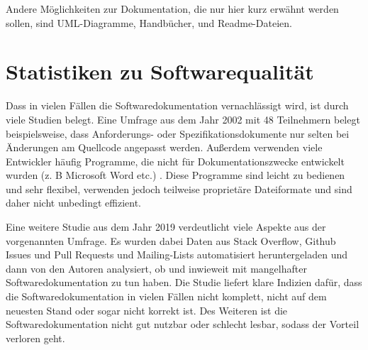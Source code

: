 Andere Möglichkeiten zur Dokumentation, die nur hier kurz erwähnt werden sollen, sind UML-Diagramme, Handbücher, und  Readme-Dateien.


\section{Statistiken zu Softwarequalität}
Dass in vielen Fällen die Softwaredokumentation vernachlässigt wird, ist durch viele Studien belegt. Eine Umfrage aus dem Jahr 2002 mit 48 Teilnehmern belegt beispielsweise, dass Anforderungs- oder Spezifikationsdokumente nur selten bei Änderungen am Quellcode angepasst werden. Außerdem verwenden viele Entwickler häufig Programme, die nicht für Dokumentationszwecke entwickelt wurden (z. B Microsoft Word etc.) \cite[S. 28-29]{TheRelevanceofSoftwareDocumentationToolsandTechnologies:ASurvey}. Diese Programme sind leicht zu bedienen und sehr flexibel, verwenden jedoch teilweise proprietäre Dateiformate und sind daher nicht unbedingt effizient.

Eine weitere Studie aus dem Jahr 2019 verdeutlicht viele Aspekte aus der vorgenannten Umfrage. Es wurden dabei Daten aus Stack Overflow, Github Issues und Pull Requests und Mailing-Lists automatisiert heruntergeladen und dann von den Autoren analysiert, ob und inwieweit mit mangelhafter Softwaredokumentation zu tun haben.  Die Studie liefert klare Indizien dafür, dass die Softwaredokumentation in vielen Fällen nicht komplett, nicht auf dem neuesten Stand oder sogar nicht korrekt ist. Des Weiteren ist die Softwaredokumentation nicht gut nutzbar oder schlecht lesbar, sodass der Vorteil verloren geht\cite[S.1201 -1204]{SoftwareDocumentationIssuesUnveiled}. 
